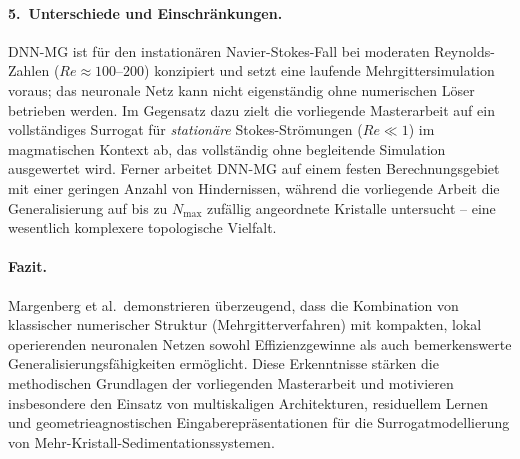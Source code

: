 \documentclass[a4paper,12pt]{article}
\begin{document}
\paragraph{5.\ Unterschiede und Einschränkungen.}
DNN-MG ist für den instationären Navier-Stokes-Fall bei moderaten
Reynolds-Zahlen ($Re \approx 100$--$200$) konzipiert und setzt eine laufende
Mehrgittersimulation voraus; das neuronale Netz kann nicht eigenständig
ohne numerischen Löser betrieben werden. Im Gegensatz dazu zielt die
vorliegende Masterarbeit auf ein vollständiges Surrogat für \emph{stationäre}
Stokes-Strömungen ($Re \ll 1$) im magmatischen Kontext ab, das vollständig
ohne begleitende Simulation ausgewertet wird. Ferner arbeitet DNN-MG auf
einem festen Berechnungsgebiet mit einer geringen Anzahl von Hindernissen,
während die vorliegende Arbeit die Generalisierung auf bis zu $N_{\max}$
zufällig angeordnete Kristalle untersucht -- eine wesentlich komplexere
topologische Vielfalt.

\paragraph{Fazit.}
Margenberg et al.\ demonstrieren überzeugend, dass die Kombination von
klassischer numerischer Struktur (Mehrgitterverfahren) mit kompakten,
lokal operierenden neuronalen Netzen sowohl Effizienzgewinne als auch
bemerkenswerte Generalisierungsfähigkeiten ermöglicht. Diese Erkenntnisse
stärken die methodischen Grundlagen der vorliegenden Masterarbeit und
motivieren insbesondere den Einsatz von multiskaligen Architekturen,
residuellem Lernen und geometrieagnostischen Eingaberepräsentationen
für die Surrogatmodellierung von Mehr-Kristall-Sedimentationssystemen.
\end{document}
